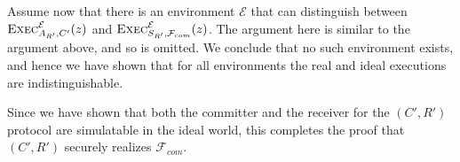 \documentclass[draft]{article}
\begin{document}
\begin{enumerate}
\begin{enumerate}
\begin{description}
      Assume now that there is an environment $\mathcal{E}$ that can distinguish between $\textsc{Exec}^\mathcal{E}_{A_{R'}, C'}(z)$ and $\textsc{Exec}^{\mathcal{E}}_{S_{R'}, \mathcal{F}_{com}}(z)$.
      The argument here is similar to the argument above, and so is omitted.
      We conclude that no such environment exists, and hence we have shown that for all environments the real and ideal executions are indistinguishable.
    \end{description}
    Since we have shown that both the committer and the receiver for the $(C', R')$ protocol are simulatable in the ideal world, this completes the proof that $(C', R')$ securely realizes $\mathcal{F}_{com}$.
  \end{enumerate}
\end{enumerate}


\end{document}
